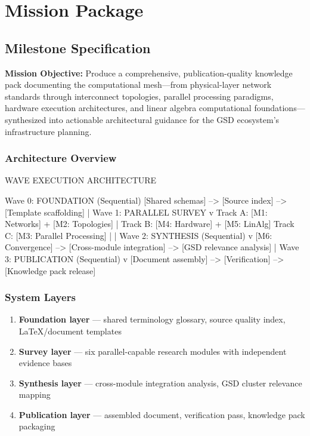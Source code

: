 \documentclass[11pt,letterpaper]{article}
\newcommand{\stageheader}[2]{%
  \noindent\colorbox{#2}{\makebox[\textwidth][l]{%
    \textcolor{white}{\bfseries\sffamily\hspace{6pt}#1\hspace{6pt}}}}%
  \vspace{0.5em}\par%
}
\begin{document}
\newpage

\stageheader{STAGE 3 --- MISSION PACKAGE}{tertiary}

\section{Mission Package}

\subsection{Milestone Specification}

\textbf{Mission Objective:} Produce a comprehensive, publication-quality knowledge pack documenting the computational mesh---from physical-layer network standards through interconnect topologies, parallel processing paradigms, hardware execution architectures, and linear algebra computational foundations---synthesized into actionable architectural guidance for the GSD ecosystem's infrastructure planning.

\subsubsection{Architecture Overview}

\begin{asciibox}
WAVE EXECUTION ARCHITECTURE

Wave 0: FOUNDATION (Sequential)
  [Shared schemas] --> [Source index] --> [Template scaffolding]
                                              |
Wave 1: PARALLEL SURVEY                      v
  Track A: [M1: Networks] + [M2: Topologies]  |  Track B: [M4: Hardware] + [M5: LinAlg]
  Track C: [M3: Parallel Processing]          |
                                              |
Wave 2: SYNTHESIS (Sequential)                v
  [M6: Convergence] --> [Cross-module integration] --> [GSD relevance analysis]
                                              |
Wave 3: PUBLICATION (Sequential)              v
  [Document assembly] --> [Verification] --> [Knowledge pack release]
\end{asciibox}

\subsubsection{System Layers}

\begin{enumerate}[leftmargin=2em]
\item \textbf{Foundation layer} --- shared terminology glossary, source quality index, LaTeX/document templates
\item \textbf{Survey layer} --- six parallel-capable research modules with independent evidence bases
\item \textbf{Synthesis layer} --- cross-module integration analysis, GSD cluster relevance mapping
\item \textbf{Publication layer} --- assembled document, verification pass, knowledge pack packaging
\end{enumerate}
\end{document}
